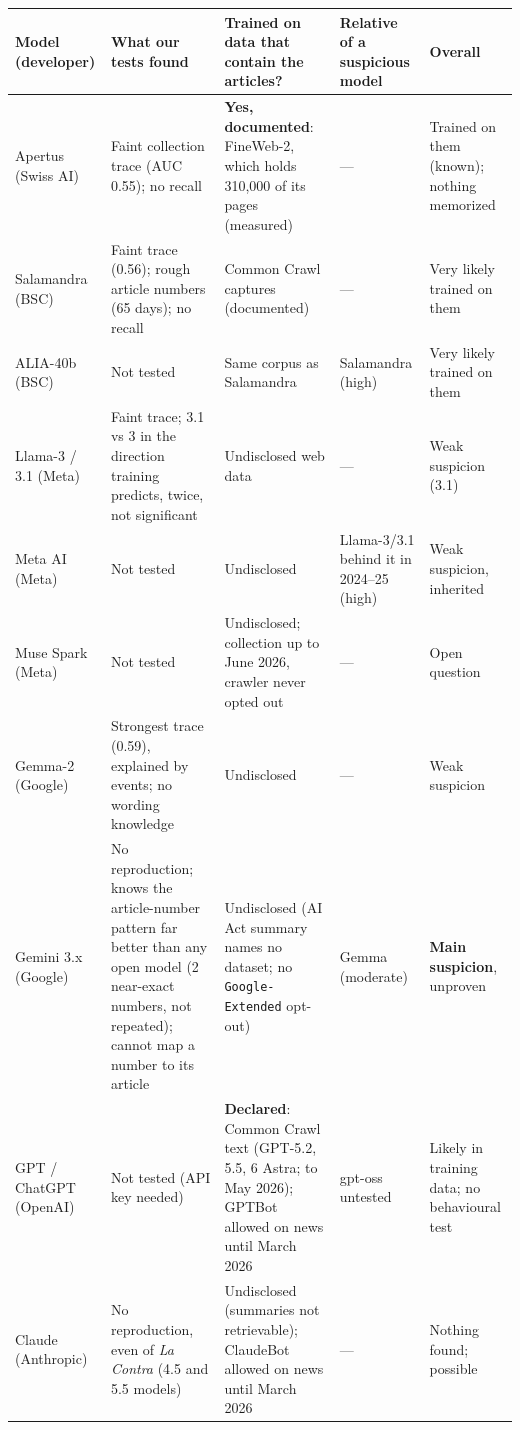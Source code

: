 \documentclass[10pt,a4paper]{article}
\begin{document}
\begin{table}[h]\centering\scriptsize
\begin{tabularx}{\linewidth}{>{\raggedright\arraybackslash}p{2.0cm}>{\raggedright\arraybackslash}X>{\raggedright\arraybackslash}X>{\raggedright\arraybackslash}p{2.2cm}>{\raggedright\arraybackslash}p{1.9cm}}
\toprule
Model (developer) & What our tests found & Trained on data that contain the articles? & Relative of a suspicious model & Overall\\
\midrule
Apertus (Swiss AI) & Faint collection trace (AUC 0.55); no recall & \textbf{Yes, documented}: FineWeb-2, which holds 310,000 of
its pages (measured) & --- & Trained on them (known); nothing memorized\\
Salamandra (BSC) & Faint trace (0.56); rough article numbers (65 days); no recall & 20 Common Crawl captures (documented)
& --- & Very likely trained on them\\
ALIA-40b (BSC) & Not tested & Same corpus as Salamandra & Salamandra (high) & Very likely trained on them\\
Llama-3 / 3.1 (Meta) & Faint trace; 3.1 vs 3 in the direction training predicts, twice, not significant & Undisclosed web
data & --- & Weak suspicion (3.1)\\
Meta AI (Meta) & Not tested & Undisclosed & Llama-3/3.1 behind it in 2024--25 (high) & Weak suspicion, inherited\\
Muse Spark (Meta) & Not tested & Undisclosed; collection up to June 2026, crawler never opted out & --- & Open question\\
Gemma-2 (Google) & Strongest trace (0.59), explained by events; no wording knowledge & Undisclosed & --- & Weak
suspicion\\
Gemini 3.x (Google) & No reproduction; knows the article-number pattern far better than any open model (2 near-exact
numbers, not repeated); cannot map a number to its article & Undisclosed (AI Act summary names no dataset; no
\texttt{Google-Extended} opt-out) & Gemma (moderate) & \textbf{Main suspicion}, unproven\\
GPT / ChatGPT (OpenAI) & Not tested (API key needed) & \textbf{Declared}: Common Crawl text (GPT-5.2, 5.5, 6 Astra; to
May 2026); GPTBot allowed on news until March 2026 & gpt-oss untested & Likely in training data; no behavioural test\\
Claude (Anthropic) & No reproduction, even of \emph{La Contra} (4.5 and 5.5 models) & Undisclosed (summaries not
retrievable); ClaudeBot allowed on news until March 2026 & --- & Nothing found; possible\\

\end{tabularx}
\end{table}
\end{document}
